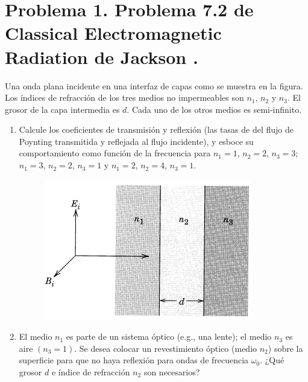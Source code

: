 \documentclass[a4paper,11pt]{article}
\numberwithin{equation}{section}
\renewcommand{\thefootnote}{\fnsymbol{footnote}}
\begin{document}

\fancyhead[R]{\thepage}

\setcounter{footnote}{0}
\renewcommand*{\thefootnote}{\arabic{footnote}}


\section{Problema 1. Problema 7.2 de Classical Electromagnetic Radiation
de Jackson \cite{jackson}.}

Una onda plana incidente en una interfaz de capas como se muestra en la figura. Los 
índices de refracción de los tres medios no impermeables son $n_1$, $n_2$ y $n_3$. 
El grosor de la capa intermedia es $d$. Cada uno de los otros medios es semi-infinito.

\begin{enumerate}[label=\textbf{(\alph*)}]
 \item Calcule los coeficientes de transmisión y reflexión (las tasas de del flujo de 
 Poynting transmitida y reflejada al flujo incidente), y esboce su comportamiento como 
 función de la frecuencia para $n_1 = 1$, $n_2 = 2$, $n_3 = 3$; $n_1 = 3$, $n_2 = 2$, 
 $n_3 = 1$ y $n_1 = 2$, $n_2 = 4$, $n_3 = 1$.


\begin{figure}[H]
 \center 
 \includegraphics[scale=0.7]{problema1fig1}
\end{figure}

\item El medio $n_1$ es parte de un sistema óptico (e.g., una lente); el medio 
$n_3$ es aire $(n_3 = 1)$. Se desea colocar un revestimiento óptico (medio $n_2$) 
sobre la superficie para que no haya reflexión para ondas de frecuencia $\omega_0$. 
¿Qué grosor $d$ e índice de refracción $n_2$ son necesarios?

\end{enumerate}
\end{document}
